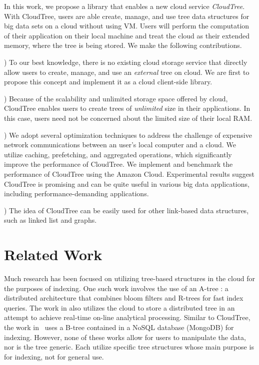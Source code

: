 \documentclass[10pt, conference, compsocconf]{IEEEtran}
\begin{document}
In this work, we propose a library that enables a 
new cloud service \emph{CloudTree}.  With CloudTree, users are able
create, manage, and use tree data structures for big data sets on a
cloud without using VM. Users will perform the computation of
their application on their local machine and treat the cloud as
their extended memory, where the tree is being stored. 
We make the following contributions.  



\smallskip 
{}) To our best knowledge, there is no existing cloud storage service
that directly allow users to create, manage, and use an
\emph{external} tree on cloud.  We are first to propose this concept
and implement it as a cloud client-side library.


) 
Because of the scalability and unlimited storage space offered
by cloud, CloudTree enables users to create trees
of \emph{unlimited} size in their applications.  In this case,
users need not be concerned about the limited size of their local RAM.


\noindent



)
We adopt several optimization techniques to address the challenge of expensive network communications
between an user's local computer and a cloud. We utilize
caching, prefetching, and aggregated operations, which significantly
improve the performance of CloudTree.  We implement and benchmark the
performance of CloudTree using the Amazon Cloud.
Experimental results suggest CloudTree is promising and can be
quite useful in various big data applications, including
performance-demanding applications.

) The idea of CloudTree can be easily used for other 
  link-based data structures, such as linked list and graphs. 


\section{Related Work}
\label{related}
Much research has been focused on utilizing tree-based structures in
the cloud for the purposes of indexing. One such work involves the use
of an A-tree \cite{Papadopoulos11}: a distributed architecture that
combines bloom filters and R-trees for fast index queries. The work in
\cite{Dehne13} also utilizes the cloud to store a distributed tree in
an attempt to achieve real-time on-line analytical processing. Similar
to CloudTree, the work in~\cite{Yu14} uses a B-tree contained in a
NoSQL database (MongoDB) for indexing. However, none of these works
allow for users to manipulate the data, nor is the tree generic. Each
utilize specific tree structures whose main purpose is for indexing,
not for general use.
\end{document}
